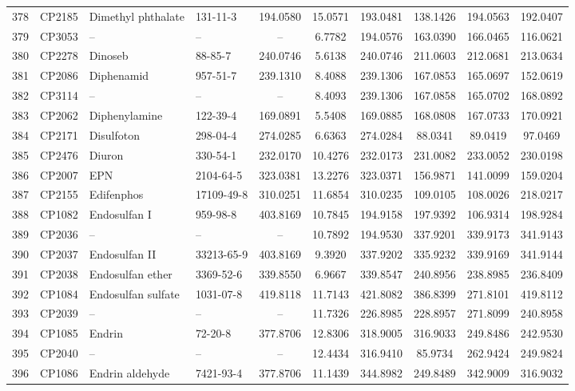 \begin{longtable}{clllcccccc}
378 & CP2185 & Dimethyl phthalate & 131-11-3 & 194.0580 & 15.0571 & 193.0481 & 138.1426 & 194.0563 & 192.0407 \\ 
379 & CP3053 & – & – & – & 6.7782 & 194.0576 & 163.0390 & 166.0465 & 116.0621 \\ 
380 & CP2278 & Dinoseb & 88-85-7 & 240.0746 & 5.6138 & 240.0746 & 211.0603 & 212.0681 & 213.0634 \\ 
381 & CP2086 & Diphenamid & 957-51-7 & 239.1310 & 8.4088 & 239.1306 & 167.0853 & 165.0697 & 152.0619 \\ 
382 & CP3114 & – & – & – & 8.4093 & 239.1306 & 167.0858 & 165.0702 & 168.0892 \\ 
383 & CP2062 & Diphenylamine & 122-39-4 & 169.0891 & 5.5408 & 169.0885 & 168.0808 & 167.0733 & 170.0921 \\ 
384 & CP2171 & Disulfoton & 298-04-4 & 274.0285 & 6.6363 & 274.0284 & 88.0341 & 89.0419 & 97.0469 \\ 
385 & CP2476 & Diuron & 330-54-1 & 232.0170 & 10.4276 & 232.0173 & 231.0082 & 233.0052 & 230.0198 \\ 
386 & CP2007 & EPN & 2104-64-5 & 323.0381 & 13.2276 & 323.0371 & 156.9871 & 141.0099 & 159.0204 \\ 
387 & CP2155 & Edifenphos & 17109-49-8 & 310.0251 & 11.6854 & 310.0235 & 109.0105 & 108.0026 & 218.0217 \\ 
388 & CP1082 & Endosulfan I & 959-98-8 & 403.8169 & 10.7845 & 194.9158 & 197.9392 & 106.9314 & 198.9284 \\ 
389 & CP2036 & – & – & – & 10.7892 & 194.9530 & 337.9201 & 339.9173 & 341.9143 \\ 
390 & CP2037 & Endosulfan II & 33213-65-9 & 403.8169 & 9.3920 & 337.9202 & 335.9232 & 339.9169 & 341.9144 \\ 
391 & CP2038 & Endosulfan ether & 3369-52-6 & 339.8550 & 6.9667 & 339.8547 & 240.8956 & 238.8985 & 236.8409 \\ 
392 & CP1084 & Endosulfan sulfate & 1031-07-8 & 419.8118 & 11.7143 & 421.8082 & 386.8399 & 271.8101 & 419.8112 \\ 
393 & CP2039 & – & – & – & 11.7326 & 226.8985 & 228.8957 & 271.8099 & 240.8958 \\ 
394 & CP1085 & Endrin & 72-20-8 & 377.8706 & 12.8306 & 318.9005 & 316.9033 & 249.8486 & 242.9530 \\ 
395 & CP2040 & – & – & – & 12.4434 & 316.9410 & 85.9734 & 262.9424 & 249.9824 \\ 
396 & CP1086 & Endrin aldehyde & 7421-93-4 & 377.8706 & 11.1439 & 344.8982 & 249.8489 & 342.9009 & 316.9032 \\ 

\end{longtable}
